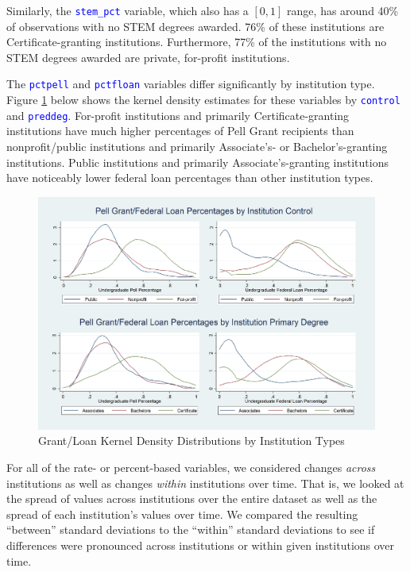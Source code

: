 \documentclass[12pt]{article}
\numberwithin{equation}{section}
\newcommand{\Varnm}[1]{\texttt{\textcolor{Blue}{#1}}}
\begin{document}
Similarly, the \Varnm{stem\_pct} variable, which also has a $[0,1]$ range, has around 40\% of observations with no STEM degrees awarded. 76\% of these institutions are Certificate-granting institutions. Furthermore, 77\% of the institutions with no STEM degrees awarded are private, for-profit institutions.

The \Varnm{pctpell} and \Varnm{pctfloan} variables differ significantly by institution type. Figure \ref{fig:aid_pct_kdensity_mr} below shows the kernel density estimates for these variables by \Varnm{control} and \Varnm{preddeg}. For-profit institutions and primarily Certificate-granting institutions have much higher percentages of Pell Grant recipients than nonprofit/public institutions and primarily Associate's- or Bachelor's-granting institutions. Public institutions and primarily Associate's-granting institutions have noticeably lower federal loan percentages than other institution types.
\newpage

\begin{figure}[h!]
\caption{Grant/Loan Kernel Density Distributions by Institution Types}
\label{fig:aid_pct_kdensity_mr}
\begin{adjustbox}{center}
\includegraphics[width=7.58in]{aid_pct_kdensity_mr.png}
\end{adjustbox}
\centering
\end{figure}

For all of the rate- or percent-based variables, we considered changes \textit{across} institutions as well as changes \textit{within} institutions over time. That is, we looked at the spread of values across institutions over the entire dataset as well as the spread of each institution's values over time. We compared the resulting \enquote{between} standard deviations to the \enquote{within} standard deviations to see if differences were pronounced across institutions or within given institutions over time.
\end{document}
